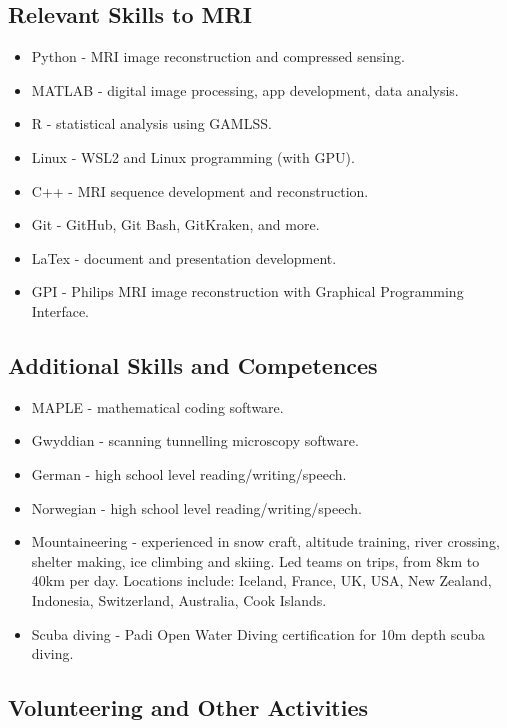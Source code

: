 \documentclass[12pt,]{scrartcl}
\begin{document}
\subsection{Relevant Skills to MRI}\label{relevant-skills}
\begin{itemize}
  \leftskip-0.25in
    \item Python - MRI image reconstruction and compressed sensing.
    \item MATLAB - digital image processing, app development, data analysis.
    \item R - statistical analysis using GAMLSS.
    \item Linux - WSL2 and Linux programming (with GPU).
    \item C++ - MRI sequence development and reconstruction.
    \item Git - GitHub, Git Bash, GitKraken, and more.
    \item LaTex - document and presentation development.
    \item GPI - Philips MRI image reconstruction with Graphical Programming Interface.

\end{itemize}

\subsection{Additional Skills and Competences}\label{additional-skills-competences}
\begin{itemize}
  \leftskip-0.25in
    \item MAPLE - mathematical coding software.
    \item Gwyddian - scanning tunnelling microscopy software.
    \item German - high school level reading/writing/speech. 
    \item Norwegian - high school level reading/writing/speech. 
    \item Mountaineering - experienced in snow craft, altitude training, river crossing, shelter making, ice climbing and skiing. Led teams on trips, from 8km to 40km per day. Locations include: Iceland, France, UK, USA, New Zealand, Indonesia, Switzerland, Australia, Cook Islands.
    \item Scuba diving - Padi Open Water Diving certification for 10m depth scuba diving. 

\end{itemize}

\subsection{Volunteering and Other Activities}\label{volunteering-other-activities}
\end{document}
